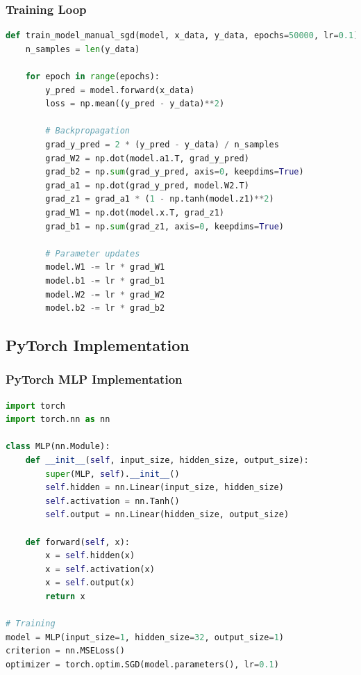 \documentclass{beamer}
\begin{document}
\begin{frame}[fragile]
\frametitle{Training Loop}
\begin{lstlisting}[language=Python, basicstyle=\tiny]
def train_model_manual_sgd(model, x_data, y_data, epochs=50000, lr=0.1):
    n_samples = len(y_data)
    
    for epoch in range(epochs):
        y_pred = model.forward(x_data)
        loss = np.mean((y_pred - y_data)**2)
        
        # Backpropagation
        grad_y_pred = 2 * (y_pred - y_data) / n_samples
        grad_W2 = np.dot(model.a1.T, grad_y_pred)
        grad_b2 = np.sum(grad_y_pred, axis=0, keepdims=True)
        grad_a1 = np.dot(grad_y_pred, model.W2.T)
        grad_z1 = grad_a1 * (1 - np.tanh(model.z1)**2)
        grad_W1 = np.dot(model.x.T, grad_z1)
        grad_b1 = np.sum(grad_z1, axis=0, keepdims=True)
        
        # Parameter updates
        model.W1 -= lr * grad_W1
        model.b1 -= lr * grad_b1
        model.W2 -= lr * grad_W2
        model.b2 -= lr * grad_b2
\end{lstlisting}
\end{frame}

\subsection{PyTorch Implementation}
\begin{frame}[fragile]
\frametitle{PyTorch MLP Implementation}
\begin{lstlisting}[language=Python, basicstyle=\small]
import torch
import torch.nn as nn

class MLP(nn.Module):
    def __init__(self, input_size, hidden_size, output_size):
        super(MLP, self).__init__()
        self.hidden = nn.Linear(input_size, hidden_size)
        self.activation = nn.Tanh()
        self.output = nn.Linear(hidden_size, output_size)

    def forward(self, x):
        x = self.hidden(x)
        x = self.activation(x)
        x = self.output(x)
        return x

# Training
model = MLP(input_size=1, hidden_size=32, output_size=1)
criterion = nn.MSELoss()
optimizer = torch.optim.SGD(model.parameters(), lr=0.1)
\end{lstlisting}
\end{frame}
\end{document}
